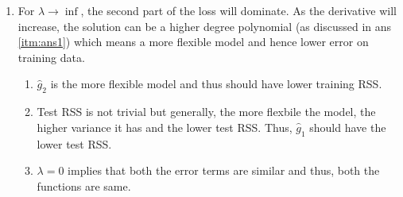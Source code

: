 \documentclass[11pt, a4paper]{article}
\begin{document}
\begin{enumerate}
        \item For $\lambda \to \inf$, the second part of the loss will dominate. As the derivative will increase, the solution can be a higher degree polynomial (as discussed in ans \ref{itm:ans1}) which means a more flexible model and hence lower error on training data.
        \begin{enumerate}
            \item $\hat{g}_{2}$ is the more flexible model and thus should have lower training RSS.
            \item Test RSS is not trivial but generally, the more flexbile the model, the higher variance it has and the lower test RSS. Thus, $\hat{g}_{1}$ should have the lower test RSS.
            \item $\lambda = 0$ implies that both the error terms are similar and thus, both the functions are same.
        \end{enumerate}
    \end{enumerate}
\end{document}
